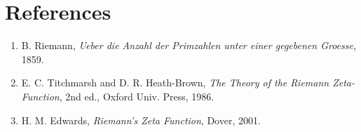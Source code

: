\documentclass[11pt]{article}
\begin{document}
\section*{References}
\begin{enumerate}
\item B. Riemann, \emph{Ueber die Anzahl der Primzahlen unter einer gegebenen Groesse}, 1859.
\item E. C. Titchmarsh and D. R. Heath-Brown, \emph{The Theory of the Riemann Zeta-Function}, 2nd ed., Oxford Univ. Press, 1986.
\item H. M. Edwards, \emph{Riemann's Zeta Function}, Dover, 2001.
\end{enumerate}
\end{document}
